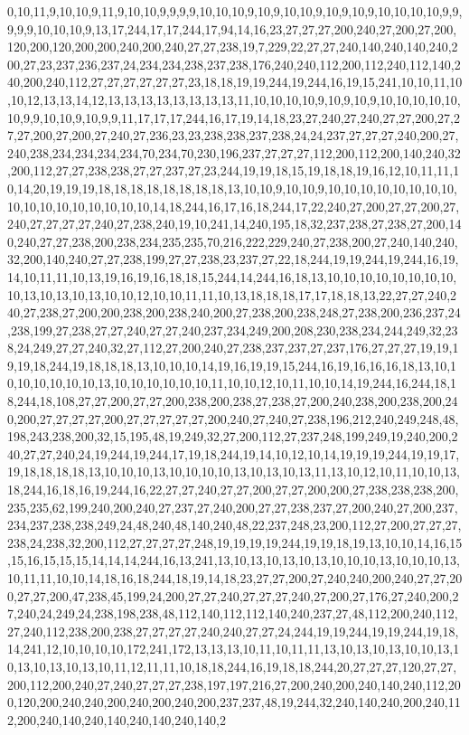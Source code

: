 0,10,11,9,10,10,9,11,9,10,10,9,9,9,9,10,10,10,9,10,9,10,10,9,10,9,10,9,10,10,10,10,9,9,9,9,9,10,10,10,9,13,17,244,17,17,244,17,94,14,16,23,27,27,27,200,240,27,200,27,200,120,200,120,200,200,240,200,240,27,27,238,19,7,229,22,27,27,240,140,240,140,240,200,27,23,237,236,237,24,234,234,238,237,238,176,240,240,112,200,112,240,112,140,240,200,240,112,27,27,27,27,27,27,23,18,18,19,19,244,19,244,16,19,15,241,10,10,11,10,10,12,13,13,14,12,13,13,13,13,13,13,13,13,11,10,10,10,10,9,10,9,10,9,10,10,10,10,10,10,9,9,10,10,9,10,9,9,11,17,17,17,244,16,17,19,14,18,23,27,240,27,240,27,27,200,27,27,27,200,27,200,27,240,27,236,23,23,238,238,237,238,24,24,237,27,27,27,240,200,27,240,238,234,234,234,234,70,234,70,230,196,237,27,27,27,112,200,112,200,140,240,32,200,112,27,27,238,238,27,27,237,27,23,244,19,19,18,15,19,18,18,19,16,12,10,11,11,10,14,20,19,19,19,18,18,18,18,18,18,18,18,13,10,10,9,10,10,9,10,10,10,10,10,10,10,10,10,10,10,10,10,10,10,10,10,14,18,244,16,17,16,18,244,17,22,240,27,200,27,27,200,27,240,27,27,27,27,240,27,238,240,19,10,241,14,240,195,18,32,237,238,27,238,27,200,140,240,27,27,238,200,238,234,235,235,70,216,222,229,240,27,238,200,27,240,140,240,32,200,140,240,27,27,238,199,27,27,238,23,237,27,22,18,244,19,19,244,19,244,16,19,14,10,11,11,10,13,19,16,19,16,18,18,15,244,14,244,16,18,13,10,10,10,10,10,10,10,10,10,13,10,13,10,13,10,10,12,10,10,11,11,10,13,18,18,18,17,17,18,18,13,22,27,27,240,240,27,238,27,200,200,238,200,238,240,200,27,238,200,238,248,27,238,200,236,237,24,238,199,27,238,27,27,240,27,27,240,237,234,249,200,208,230,238,234,244,249,32,238,24,249,27,27,240,32,27,112,27,200,240,27,238,237,237,27,237,176,27,27,27,19,19,19,19,18,244,19,18,18,18,13,10,10,10,14,19,16,19,19,15,244,16,19,16,16,16,18,13,10,10,10,10,10,10,10,13,10,10,10,10,10,10,11,10,10,12,10,11,10,10,14,19,244,16,244,18,18,244,18,108,27,27,200,27,27,200,238,200,238,27,238,27,200,240,238,200,238,200,240,200,27,27,27,27,200,27,27,27,27,27,200,240,27,240,27,238,196,212,240,249,248,48,198,243,238,200,32,15,195,48,19,249,32,27,200,112,27,237,248,199,249,19,240,200,240,27,27,240,24,19,244,19,244,17,19,18,244,19,14,10,12,10,14,19,19,19,244,19,19,17,19,18,18,18,18,13,10,10,10,13,10,10,10,10,13,10,13,10,13,11,13,10,12,10,11,10,10,13,18,244,16,18,16,19,244,16,22,27,27,240,27,27,200,27,27,200,200,27,238,238,238,200,235,235,62,199,240,200,240,27,237,27,240,200,27,27,238,237,27,200,240,27,200,237,234,237,238,238,249,24,48,240,48,140,240,48,22,237,248,23,200,112,27,200,27,27,27,238,24,238,32,200,112,27,27,27,27,248,19,19,19,19,244,19,19,18,19,13,10,10,14,16,15,15,16,15,15,15,14,14,14,244,16,13,241,13,10,13,10,13,10,13,10,10,10,13,10,10,10,13,10,11,11,10,10,14,18,16,18,244,18,19,14,18,23,27,27,200,27,240,240,200,240,27,27,200,27,27,200,47,238,45,199,24,200,27,27,240,27,27,27,240,27,200,27,176,27,240,200,27,240,24,249,24,238,198,238,48,112,140,112,112,140,240,237,27,48,112,200,240,112,27,240,112,238,200,238,27,27,27,27,240,240,27,27,24,244,19,19,244,19,19,244,19,18,14,241,12,10,10,10,10,172,241,172,13,13,13,10,11,10,11,11,13,10,13,10,13,10,10,13,10,13,10,13,10,13,10,11,12,11,11,10,18,18,244,16,19,18,18,244,20,27,27,27,120,27,27,200,112,200,240,27,240,27,27,27,238,197,197,216,27,200,240,200,240,140,240,112,200,120,200,240,240,200,240,200,240,200,237,237,48,19,244,32,240,140,240,200,240,112,200,240,140,240,140,240,140,240,140,2